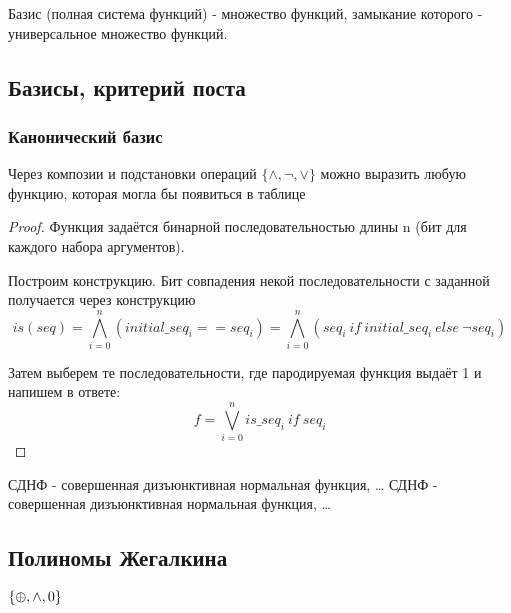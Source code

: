 \documentclass[a4paper, 12pt]{article}
\begin{document}
    \begin{definition}
        Базис (полная система функций) - множество функций, 
        замыкание которого - универсальное множество функций.
    \end{definition}

    \subsection{Базисы, критерий поста}

    \subsubsection{Канонический базис}
    
    \begin{theorem}
        Через композии и подстановки операций $\{ \land, \lnot, \lor  \}$ можно выразить любую функцию, которая могла бы появиться в таблице
    \end{theorem}
    \begin{proof}
        Функция задаётся бинарной последовательностью длины n (бит для каждого набора аргументов).

        Построим конструкцию. 
        Бит совпадения некой последовательности с заданной получается через конструкцию 
        \begin{equation}
            is(seq) = \bigwedge_{i=0}^{n} (initial\_seq_i == seq_i) = \bigwedge_{i=0}^{n} (seq_i ~ if ~ initial\_seq_i ~ else ~ \lnot seq_i)
        \end{equation}
    
        Затем выберем те последовательности, где пародируемая функция выдаёт 1 и напишем в ответе:
        \begin{equation}
            f = \bigvee_{i = 0}^{n} is\_seq_i ~ if ~ seq_i
        \end{equation}
    \end{proof}


    \begin{definition}
        СДНФ - совершенная дизъюнктивная нормальная функция, \ldots
        СДНФ - совершенная дизъюнктивная нормальная функция, \ldots
    \end{definition}

    \subsection{Полиномы Жегалкина}

    $\{ \oplus, \land, \boldmath{0} \}$
\end{document}
